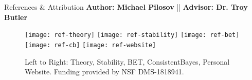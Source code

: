   \begin{block}{References \& Attribution}
    \centering
    \textbf{Author: Michael Pilosov} || \textbf{Advisor: Dr. Troy Butler}
    \begin{figure}
        \texttt{[image: ref-theory]}
        \texttt{[image: ref-stability]}
        \texttt{[image: ref-bet]}
        \texttt{[image: ref-cb]}
        \texttt{[image: ref-website]}
    \caption{\centering Left to Right: Theory, Stability, BET, ConsistentBayes, Personal Website. \newline Funding provided by NSF DMS-1818941.}
    \end{figure}
   

  

  \end{block}


